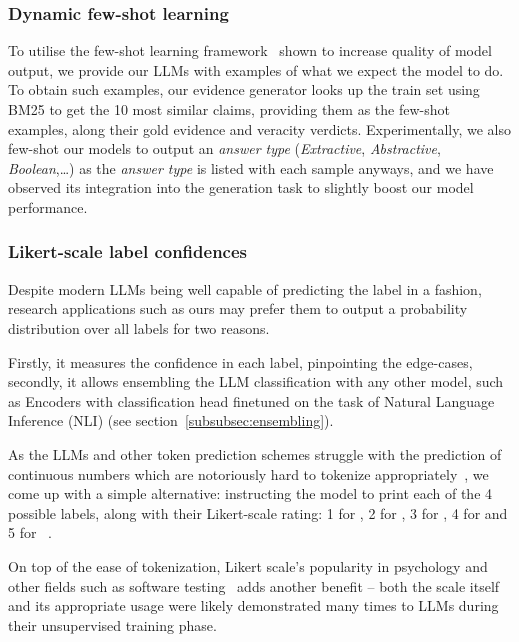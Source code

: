 \subsubsection{Dynamic few-shot learning}
To utilise the few-shot learning framework~\cite{fewshot} shown to increase quality of model output, we provide our LLMs with examples of what we expect the model to do.
To obtain such examples, our evidence generator looks up the \averitec{} train set using BM25 to get the 10 most similar claims, providing them as the few-shot examples, along their gold evidence and veracity verdicts.
Experimentally, we also few-shot our models to output an \textit{answer type} (\textit{Extractive}, \textit{Abstractive}, \textit{Boolean},\dots) as the \textit{answer type} is listed with each sample anyways, and we have observed its integration into the generation task to slightly boost our model performance.

\subsubsection{Likert-scale label confidences}
\label{likert}
Despite modern LLMs being well capable of predicting the label in a  fashion, research applications such as ours may prefer them to output a probability distribution over all labels for two reasons.

Firstly, it measures the confidence in each label, pinpointing the edge-cases, secondly, it allows ensembling the LLM classification with any other model, such as Encoders with classification head finetuned on the task of Natural Language Inference (NLI) (see section~\ref{subsubsec:ensembling}).

As the LLMs and other token prediction schemes struggle with the prediction of continuous numbers which are notoriously hard to tokenize appropriately~\cite{golkar2023xvalcontinuousnumberencoding}, we come up with a simple alternative: instructing the model to print each of the 4 possible labels, along with their Likert-scale rating: 1 for , 2 for , 3 for , 4 for  and 5 for ~\cite{likert1932technique}.

On top of the ease of tokenization, Likert scale's popularity in psychology and other fields such as software testing~\cite{likertstudy} adds another benefit -- both the scale itself and its appropriate usage were likely demonstrated many times to LLMs during their unsupervised training phase.

